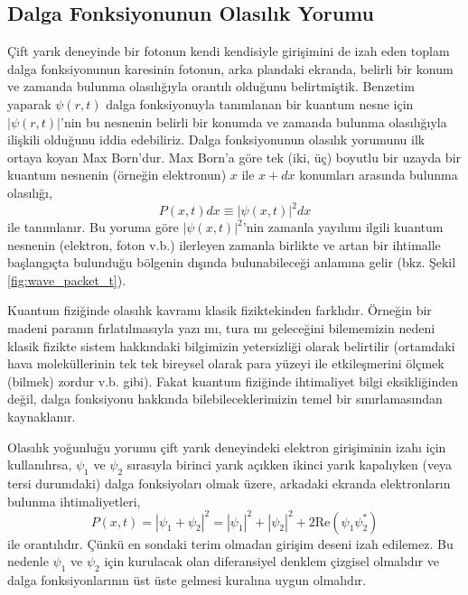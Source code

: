 \documentclass[00_kitap.tex]{subfiles}
\begin{document}
\subsection{Dalga Fonksiyonunun Olasılık Yorumu}

Çift yarık deneyinde bir fotonun kendi kendisiyle girişimini de izah eden toplam dalga fonksiyonunun karesinin fotonun, arka plandaki ekranda, belirli bir konum ve zamanda bulunma olasılığıyla orantılı olduğunu belirtmiştik. Benzetim yaparak $\psi(r,t)$ dalga fonksiyonuyla tanımlanan bir kuantum nesne için $|\psi(r,t)|$'nin bu nesnenin belirli bir konumda ve zamanda bulunma olasılığıyla ilişkili olduğunu iddia edebiliriz. Dalga fonksiyonunun olasılık yorumunu ilk ortaya koyan Max Born'dur. Max Born'a göre tek (iki, üç) boyutlu bir uzayda bir kuantum nesnenin (örneğin elektronun) $x$ ile $x+dx$ konumları arasında bulunma olasılığı,
\begin{equation}
P(x,t) dx \equiv |\psi(x,t)|^2 dx
\label{eq:probability_interp}
\end{equation}
ile tanımlanır. Bu yoruma göre $|\psi(x,t)|^2$'nin zamanla yayılımı ilgili kuantum nesnenin (elektron, foton v.b.) ilerleyen zamanla birlikte ve artan bir ihtimalle başlangıçta bulunduğu bölgenin dışında bulunabileceği anlamına gelir (bkz. Şekil \ref{fig:wave_packet_t}).

Kuantum fiziğinde olasılık kavramı klasik fiziktekinden farklıdır. Örneğin bir madeni paranın fırlatılmasıyla yazı mı, tura mı geleceğini bilememizin nedeni klasik fizikte sistem hakkındaki bilgimizin yetersizliği olarak belirtilir (ortamdaki hava moleküllerinin tek tek bireysel olarak para yüzeyi ile etkileşmerini ölçmek (bilmek) zordur v.b. gibi). Fakat kuantum fiziğinde ihtimaliyet bilgi eksikliğinden değil, dalga fonksiyonu hakkında bilebileceklerimizin temel bir sınırlamasından kaynaklanır.

Olasılık yoğunluğu yorumu çift yarık deneyindeki elektron girişiminin izahı için kullanılırsa, $\psi_1$ ve $\psi_2$ sırasıyla birinci yarık açıkken ikinci yarık kapalıyken (veya tersi durumdaki) dalga fonksiyoları olmak üzere, arkadaki ekranda elektronların bulunma ihtimaliyetleri,
\begin{equation}
P(x,t) = |\psi_1 + \psi_2|^2 = |\psi_1 |^2 + |\psi_2|^2 + 2\text{Re}(\psi_1  \psi_2^*)
\label{eq:interference_probability}
\end{equation}
ile orantılıdır. Çünkü en sondaki terim olmadan girişim deseni izah edilemez. Bu nedenle $\psi_1$ ve $\psi_2$ için kurulacak olan diferansiyel denklem çizgisel olmalıdır ve dalga fonksiyonlarının üst üste gelmesi kuralına uygun olmalıdır.
\end{document}

